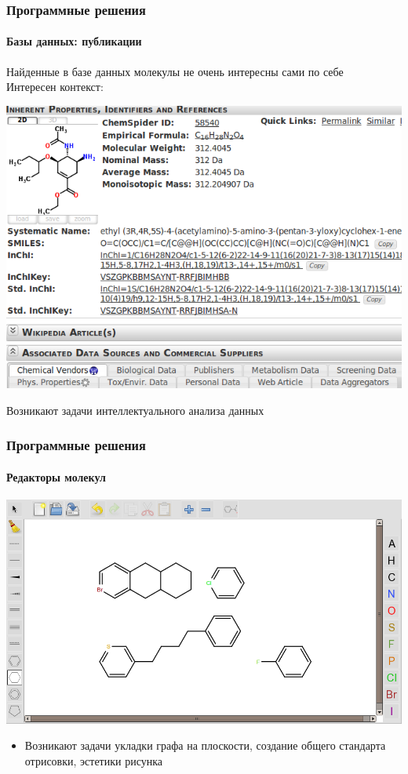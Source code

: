 \begin{frame}
  \frametitle{Программные решения}
  \framesubtitle{Базы данных: публикации}
    Найденные в базе данных молекулы не очень интересны сами по себе \\
    Интересен контекст:
    \begin{center}
    \includegraphics[scale=0.42]{images/chemspider.png}
    \end{center}
    \begin{center}Возникают задачи интеллектуального анализа данных \end{center}
\end{frame}

\begin{frame}
  \frametitle{Программные решения}
  \framesubtitle{Редакторы молекул}

  \begin{center}
    \includegraphics[scale=0.37]{images/sketcher.png}
  \end{center}
  \begin{itemize}
    \item Возникают задачи укладки графа на плоскости, создание общего стандарта отрисовки, эстетики рисунка 
  \end{itemize}

\end{frame}

